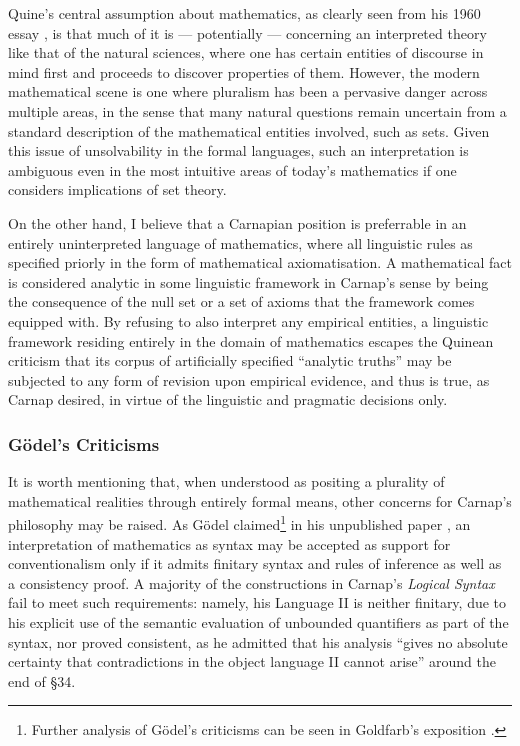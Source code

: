 \documentclass[12pt]{article}
\theoremstyle{plain}
\theoremstyle{definition}
\begin{document}
Quine's central assumption about mathematics, as clearly seen from his 1960 essay \cite{quine-to-carnap}, is that much of it is --- potentially --- concerning an interpreted theory like that of the natural sciences, where one has certain entities of discourse in mind first and proceeds to discover properties of them. However, the modern mathematical scene is one where pluralism has been a pervasive danger across multiple areas, in the sense that many natural questions remain uncertain from a standard description of the mathematical entities involved, such as sets. Given this issue of unsolvability in the formal languages, such an interpretation is ambiguous even in the most intuitive areas of today's mathematics if one considers implications of set theory.

On the other hand, I believe that a Carnapian position is preferrable in an entirely uninterpreted language of mathematics, where all linguistic rules as specified priorly in the form of mathematical axiomatisation. A mathematical fact is considered analytic in some linguistic framework in Carnap's sense by being the consequence of the null set or a set of axioms that the framework comes equipped with. By refusing to also interpret any empirical entities, a linguistic framework residing entirely in the domain of mathematics escapes the Quinean criticism that its corpus of artificially specified ``analytic truths'' may be subjected to any form of revision upon empirical evidence, and thus is true, as Carnap desired, in virtue of the linguistic and pragmatic decisions only.

\subsubsection*{G\"odel's Criticisms}

It is worth mentioning that, when understood as positing a plurality of mathematical realities through entirely formal means, other concerns for Carnap's philosophy may be raised. As G\"odel claimed\footnote{Further analysis of G\"odel's criticisms can be seen in Goldfarb's exposition \cite{goldfarb-positivism}.} in his unpublished paper \cite{godel-positivism}, an interpretation of mathematics as syntax may be accepted as support for conventionalism only if it admits finitary syntax and rules of inference as well as a consistency proof. A majority of the constructions in Carnap's \emph{Logical Syntax} fail to meet such requirements: namely, his Language II is neither finitary, due to his explicit use of the semantic evaluation of unbounded quantifiers as part of the syntax, nor proved consistent, as he admitted that his analysis ``gives no absolute certainty that contradictions in the object language II cannot arise'' around the end of \S 34.
\end{document}
